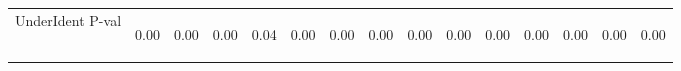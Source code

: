 \begin{center}
\begin{tabular}{lcccccccccccccc}
UnderIdent P-val & \begin{normalsize}0.00\end{normalsize} & \begin{normalsize}0.00\end{normalsize} & \begin{normalsize}0.00\end{normalsize} & \begin{normalsize}0.04\end{normalsize} & \begin{normalsize}0.00\end{normalsize} & \begin{normalsize}0.00\end{normalsize} & \begin{normalsize}0.00\end{normalsize} & \begin{normalsize}0.00\end{normalsize} & \begin{normalsize}0.00\end{normalsize} & \begin{normalsize}0.00\end{normalsize} & \begin{normalsize}0.00\end{normalsize} & \begin{normalsize}0.00\end{normalsize} & \begin{normalsize}0.00\end{normalsize} & \begin{normalsize}0.00\end{normalsize}\\

\end{tabular}
\end{center}
